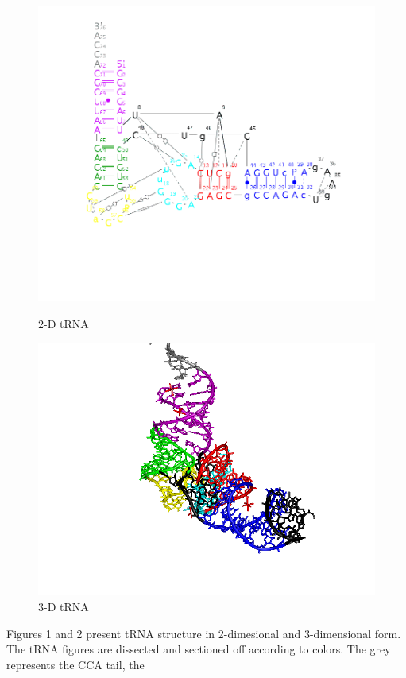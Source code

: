\documentclass[pdftex, 12pt]{article}
\begin{document}
\begin{figure}[ht]
  \begin{minipage}[b]{0.5\linewidth}
    \centering
    \includegraphics[scale=.35]{secstrtRNA.png}
    \caption{2-D tRNA}
    \label{fig:figure1}
   \end{minipage}
   \hspace{0.5cm}
   \begin{minipage}[b]{0.5\linewidth}
     \centering
     \includegraphics[scale=.35]{secstrtRNA_2.png}
     \caption{3-D tRNA}
     \label{fig:figure2}
    \end{minipage}
\end{figure} Figures  1 and 2  present tRNA structure  in 2-dimesional
and 3-dimensional  form. The tRNA figures are  dissected and sectioned
off according to colors. The grey represents the CCA tail, the
\end{document}
